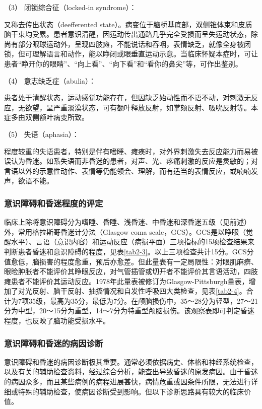 \hypertarget{text00010.htmlux5cux23CHP1-2-2-2-2-3}{}
（3） 闭锁综合征（locked-in syndrome）：

又称去传出状态（deefferented
state）。病变位于脑桥基底部，双侧锥体束和皮质脑干束均受累。患者意识清醒，因运动传出通路几乎完全受损而呈失运动状态，除尚有部分眼球运动外，呈现四肢瘫，不能说话和吞咽，表情缺乏，就像全身被闭锁，但可理解语言和动作，能以睁闭或眼垂直运动示意。当临床怀疑本症时，可让患者“睁开你的眼睛”、“向上看”、“向下看”和“看你的鼻尖”等，可作出鉴别。

\hypertarget{text00010.htmlux5cux23CHP1-2-2-2-2-4}{}
（4） 意志缺乏症（abulia）：

患者处于清醒状态，运动感觉功能存在，但因缺乏始动性而不语不动，对刺激无反应，无欲望，呈严重淡漠状态，可有额叶释放反射，如掌颏反射、吸吮反射等。本症多由双侧额叶病变所致。

\hypertarget{text00010.htmlux5cux23CHP1-2-2-2-2-5}{}
（5） 失语（aphasia）：

程度较重的失语患者，特别是伴有嗜睡、瘫痪时，对外界刺激失去反应能力而易被误认为昏迷。如系失语而非昏迷的患者，对声、光、疼痛刺激的反应是灵敏的；对言语以外的示意性动作、表情等仍能领会、理解，而有适当的表情反应，或喃喃发声，欲语不能。

\subsubsection{意识障碍和昏迷程度的评定}

临床上除将意识障碍分为嗜睡、昏睡、浅昏迷、中昏迷和深昏迷五级（见前述）外，常用格拉斯哥昏迷计分法（Glasgow
coma
scale，GCS）。GCS是以睁眼（觉醒水平）、言语（意识内容）和运动反应（病损平面）三项指标的15项检查结果来判断患者昏迷和意识障碍的程度，见表\ref{tab2-3}。以上三项检查共计15分。GCS分值愈低，脑损害的程度愈重，预后亦愈差。但此量表有一定局限性：对眼肌麻痹、眼睑肿胀者不能评价其睁眼反应，对气管插管或切开者不能评价其言语活动，四肢瘫患者不能评价其运动反应。1978年此量表被修订为Glasgow-Pittsburgh量表，增加了对光反射、脑干反射、抽搐情况和自发性呼吸四大类检查，见表\ref{tab2-4}。合计为7项35级，最高为35分，最低为7分。在颅脑损伤中，35～28分为轻型，27～21分为中型，20～15分为重型，14～7分为特重型颅脑损伤。该观察表即可判定昏迷程度，也反映了脑功能受损水平。

\subsubsection{意识障碍和昏迷的病因诊断}

意识障碍和昏迷的病因诊断极其重要。通常必须依据病史、体格和神经系统检查，以及有关的辅助检查资料，经过综合分析，能查出导致昏迷的原发病因。由于昏迷的病因众多，而且某些病例的病程进展甚快，病情危重或因条件所限，无法进行详细或特殊的辅助检查，使病因诊断受到影响。但以下诊断思路具有较大的临床价值。

